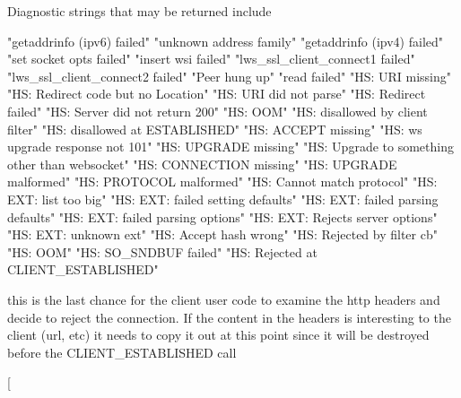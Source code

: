 \begin{Desc}
\begin{description}
Diagnostic strings that may be returned include \begin{DoxyVerb}    "getaddrinfo (ipv6) failed"
    "unknown address family"
    "getaddrinfo (ipv4) failed"
    "set socket opts failed"
    "insert wsi failed"
    "lws_ssl_client_connect1 failed"
    "lws_ssl_client_connect2 failed"
    "Peer hung up"
    "read failed"
    "HS: URI missing"
    "HS: Redirect code but no Location"
    "HS: URI did not parse"
    "HS: Redirect failed"
    "HS: Server did not return 200"
    "HS: OOM"
    "HS: disallowed by client filter"
    "HS: disallowed at ESTABLISHED"
    "HS: ACCEPT missing"
    "HS: ws upgrade response not 101"
    "HS: UPGRADE missing"
    "HS: Upgrade to something other than websocket"
    "HS: CONNECTION missing"
    "HS: UPGRADE malformed"
    "HS: PROTOCOL malformed"
    "HS: Cannot match protocol"
    "HS: EXT: list too big"
    "HS: EXT: failed setting defaults"
    "HS: EXT: failed parsing defaults"
    "HS: EXT: failed parsing options"
    "HS: EXT: Rejects server options"
    "HS: EXT: unknown ext"
    "HS: Accept hash wrong"
    "HS: Rejected by filter cb"
    "HS: OOM"
    "HS: SO_SNDBUF failed"
    "HS: Rejected at CLIENT_ESTABLISHED"\end{DoxyVerb}
 \item[{\em 
L\+W\+S\+\_\+\+C\+A\+L\+L\+B\+A\+C\+K\+\_\+\+C\+L\+I\+E\+N\+T\+\_\+\+F\+I\+L\+T\+E\+R\+\_\+\+P\+R\+E\+\_\+\+E\+S\+T\+A\+B\+L\+I\+SH\hypertarget{group__usercb_ggad62860e19975ba4c4af401c3cdb6abf7aa536e574a642ff3ab9e12bff7ba2c6a2}{}\label{group__usercb_ggad62860e19975ba4c4af401c3cdb6abf7aa536e574a642ff3ab9e12bff7ba2c6a2}
}]this is the last chance for the client user code to examine the http headers and decide to reject the connection. If the content in the headers is interesting to the client (url, etc) it needs to copy it out at this point since it will be destroyed before the C\+L\+I\+E\+N\+T\+\_\+\+E\+S\+T\+A\+B\+L\+I\+S\+H\+ED call \item[{\em 
}
\end{description}
\end{Desc}
